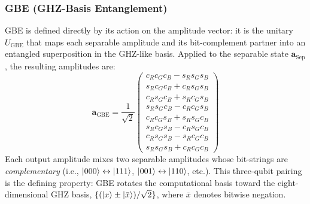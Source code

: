 \documentclass[conference,compsoc]{IEEEtran}
\begin{document}
\subsubsection{GBE (GHZ-Basis Entanglement)}
\label{sec:gbe}
GBE is defined directly by its action on the amplitude vector: it is the unitary $U_\text{GBE}$ that maps each separable amplitude and its bit-complement partner into an entangled superposition in the GHZ-like basis.
Applied to the separable state $\mathbf{a}_\text{Sep}$, the resulting amplitudes are:
\begin{equation}
    \mathbf{a}_\text{GBE} = \frac{1}{\sqrt{2}} \begin{pmatrix} c_R c_G c_B - s_R s_G s_B \\ s_R c_G c_B + c_R s_G s_B \\ c_R s_G c_B + s_R c_G s_B \\ s_R s_G c_B - c_R c_G s_B \\ c_R c_G s_B + s_R s_G c_B \\ s_R c_G s_B - c_R s_G c_B \\ c_R s_G s_B - s_R c_G c_B \\ s_R s_G s_B + c_R c_G c_B \end{pmatrix}
    \label{eq:amps_gbe}
\end{equation}
Each output amplitude mixes two separable amplitudes whose bit-strings are \emph{complementary} (i.e., $\ket{000}\leftrightarrow\ket{111}$, $\ket{001}\leftrightarrow\ket{110}$, etc.).
This three-qubit pairing is the defining property: GBE rotates the computational basis toward the eight-dimensional GHZ basis, $\{(\ket{x} \pm \ket{\bar x})/\sqrt{2}\}$, where $\bar x$ denotes bitwise negation.
\end{document}
